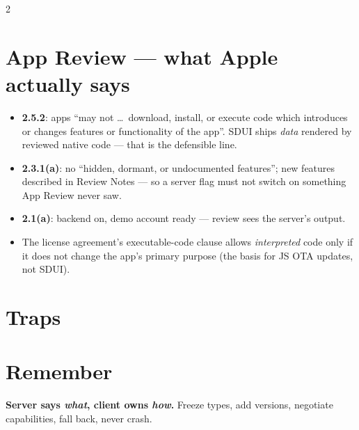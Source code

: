\documentclass[8pt]{extarticle}
\begin{document}
\begin{multicols}{2}
\section{App Review — what Apple actually says}
\begin{itemize}
  \item \textbf{2.5.2}: apps ``may not \dots\ download, install, or execute code which
        introduces or changes features or functionality of the app''. SDUI ships
        \emph{data} rendered by reviewed native code — that is the defensible line.
  \item \textbf{2.3.1(a)}: no ``hidden, dormant, or undocumented features''; new features
        described in Review Notes — so a server flag must not switch on something App Review
        never saw.
  \item \textbf{2.1(a)}: backend on, demo account ready — review sees the server's output.
  \item The license agreement's executable-code clause allows \emph{interpreted} code only if
        it does not change the app's primary purpose (the basis for JS OTA updates, not SDUI).
\end{itemize}

\section{Traps}
\begin{itemize}
\end{itemize}

\section{Remember}
\textbf{Server says \emph{what}, client owns \emph{how}.} Freeze types, add versions,
negotiate capabilities, fall back, never crash.


\end{multicols}

\end{document}
